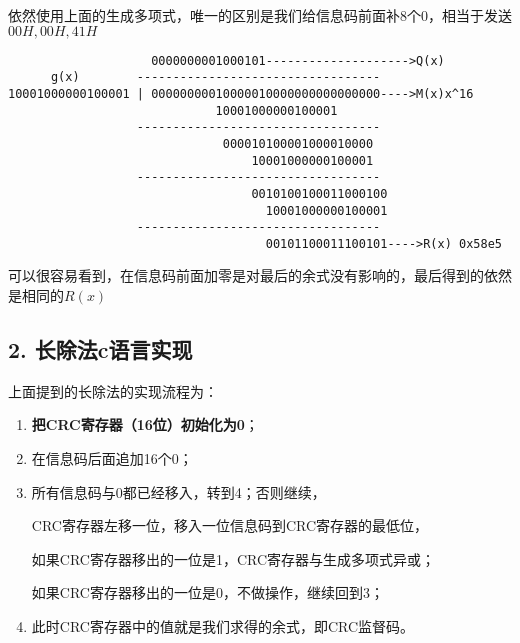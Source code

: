 \documentclass[
]{article}
\begin{document}
依然使用上面的生成多项式，唯一的区别是我们给信息码前面补8个0，相当于发送\(00H,00H,41H\)

\begin{verbatim}
                    0000000001000101-------------------->Q(x)
      g(x)        ----------------------------------
10001000000100001 | 00000000010000010000000000000000---->M(x)x^16
                             10001000000100001
                  ----------------------------------
                              000010100001000010000
                                  10001000000100001
                  ----------------------------------
                                  0010100100011000100
                                    10001000000100001
                  ----------------------------------
                                    00101100011100101---->R(x) 0x58e5
\end{verbatim}

可以很容易看到，在信息码前面加零是对最后的余式没有影响的，最后得到的依然是相同的\(R(x)\)

\hypertarget{header-n109}{%
\subsection{2. 长除法c语言实现}\label{header-n109}}

上面提到的长除法的实现流程为：

\begin{enumerate}
\def\labelenumi{\arabic{enumi}.}
\item
  \textbf{把CRC寄存器（16位）初始化为0}；
\item
  在信息码后面追加16个0；
\item
  所有信息码与0都已经移入，转到4；否则继续，

  CRC寄存器左移一位，移入一位信息码到CRC寄存器的最低位，

  如果CRC寄存器移出的一位是1，CRC寄存器与生成多项式异或；

  如果CRC寄存器移出的一位是0，不做操作，继续回到3；
\item
  此时CRC寄存器中的值就是我们求得的余式，即CRC监督码。
\end{enumerate}
\end{document}
